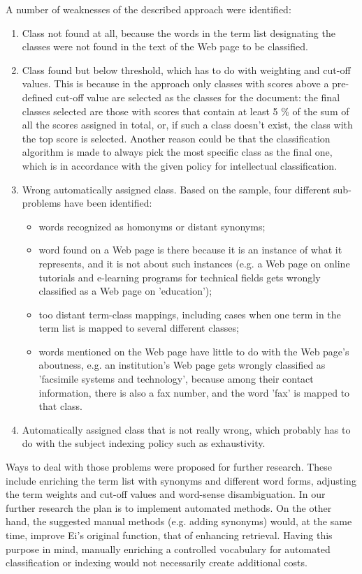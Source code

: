 A number of weaknesses of the described approach were identified:
\begin{enumerate}
\item Class not found at all, because the words in the term list designating the classes were not found in the text of the Web page to be classified.
\item Class found but below threshold, which has to do with weighting and cut-off values. This is because in the approach only classes with scores above a pre-defined cut-off value are selected as the classes for the document: the final classes selected are those with scores that contain at least 5 \% of the sum of all the scores assigned in total, or, if such a class doesn't exist, the class with the top score is selected. Another reason could be that the classification algorithm is made to always pick the most specific class as the final one, which is in accordance with the given policy for intellectual classification.
\item Wrong automatically assigned class. Based on the sample, four different sub-problems have been identified:
\begin{itemize}
\item words recognized as homonyms or distant synonyms; 
\item word found on a Web page is there because it is an instance of what it represents, and it is not about such instances (e.g. a Web page on online tutorials and e-learning programs for technical fields gets wrongly classified as a Web page on 'education');
\item too distant term-class mappings, including cases when one term in the term list is mapped to several different classes;
\item words mentioned on the Web page have little to do with the Web page's aboutness, e.g. an institution's Web page gets wrongly classified as 'facsimile systems and technology', because among their contact information, there is also a fax number, and the word 'fax' is mapped to that class.
\end{itemize}
\item Automatically assigned class that is not really wrong, which probably has to do with the subject indexing policy such as exhaustivity. 
\end{enumerate}

Ways to deal with those problems were proposed for further research. These include enriching the term list with synonyms and different word forms, adjusting the term weights and cut-off values and word-sense disambiguation. In our further research the plan is to implement automated methods. On the other hand, the suggested manual methods (e.g. adding synonyms) would, at the same time, improve Ei's original function, that of enhancing retrieval. Having this purpose in mind, manually enriching a controlled vocabulary for automated classification or indexing would not necessarily create additional costs. 


